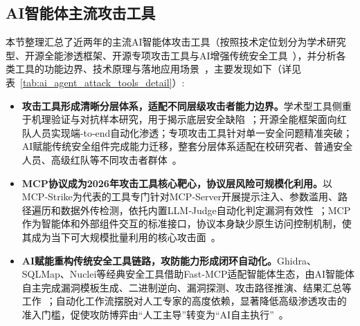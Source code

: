 \subsection{AI智能体主流攻击工具}
本节整理汇总了近两年的主流AI智能体攻击工具（按照技术定位划分为学术研究型、开源全能渗透框架、开源专项攻击工具与AI增强传统安全工具~\cite{Xu2026LoopTrap,Liu2025AgentFuzz}），并分析各类工具的功能边界、技术原理与落地应用场景~\cite{MCPStrike,Crawford2026GhidraMCPAttack}，主要发现如下（详见表~\ref{tab:ai_agent_attack_tools_detail}）:
\begin{itemize}[tabitem]
  \item \textbf{攻击工具形成清晰分层体系，适配不同层级攻击者能力边界。}学术型工具侧重于机理验证与对抗样本研究，用于揭示底层安全缺陷~\cite{Nazary2025PoisonRAG}；开源全能框架面向红队人员实现端‑to‑end自动化渗透；专项攻击工具针对单一安全问题精准突破；AI赋能传统安全组件完成能力迁移，整套分层体系适配在校研究者、普通安全人员、高级红队等不同攻击者群体~\cite{HexStrike,AgentBreaker}。
  
  \item \textbf{MCP协议成为2026年攻击工具核心靶心，协议层风险可规模化利用。}以MCP‑Strike为代表的工具专门针对MCP‑Server开展提示注入、参数滥用、路径遍历和数据外传检测，依托内置LLM‑Judge自动化判定漏洞有效性~\cite{MCPStrike}；MCP作为智能体和外部组件交互的标准接口，协议本身缺少原生访问控制机制，使其成为当下可大规模批量利用的核心攻击面~\cite{Crawford2026GhidraMCPAttack}。
  
  \item \textbf{AI赋能重构传统安全工具链路，攻防能力形成闭环自动化。}Ghidra、SQLMap、Nuclei等经典安全工具借助Fast‑MCP适配智能体生态，由AI智能体自主完成漏洞模板生成、二进制逆向、漏洞探测、攻击路径推演、结果汇总等工作~\cite{SQLMap,FastMCP}；自动化工作流摆脱对人工专家的高度依赖，显著降低高级渗透攻击的准入门槛，促使攻防博弈由“人工主导”转变为“AI自主执行”~\cite{RedAmon}。
\end{itemize}


\begingroup
\enlargethispage{1cm}
\footnotesize
\centering


